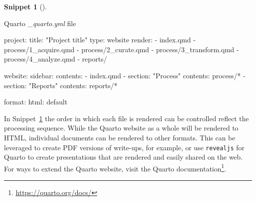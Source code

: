 \documentclass[
  letterpaper,
  krantz1]{latex/krantz-mod}
\newenvironment{Shaded}{\begin{snugshade}}{\end{snugshade}}
\newcommand{\AttributeTok}[1]{\textcolor[rgb]{0.00,0.00,0.00}{#1}}
\newcommand{\FunctionTok}[1]{\textcolor[rgb]{0.00,0.00,0.00}{#1}}
\newcommand{\KeywordTok}[1]{\textcolor[rgb]{0.00,0.00,0.00}{#1}}
\newcommand{\StringTok}[1]{\textcolor[rgb]{0.00,0.00,0.00}{#1}}
\theoremstyle{definition}
\theoremstyle{definition}
\newtheorem{definition}{Snippet}[chapter]
\theoremstyle{remark}
\DeclareRobustCommand{\href}[2]{#2\footnote{\url{#1}}}
\begin{document}
\begin{definition}[]\protect\hypertarget{def-quarto-yml}{}\label{def-quarto-yml}

Quarto \emph{\_quarto.yml} file

\begin{Shaded}
\begin{Highlighting}[]
\FunctionTok{project}\KeywordTok{:}
\AttributeTok{  }\FunctionTok{title}\KeywordTok{:}\AttributeTok{ }\StringTok{"Project title"}
\AttributeTok{  }\FunctionTok{type}\KeywordTok{:}\AttributeTok{ website}
\AttributeTok{  }\FunctionTok{render}\KeywordTok{:}
\AttributeTok{    }\KeywordTok{{-}}\AttributeTok{ index.qmd}
\AttributeTok{    }\KeywordTok{{-}}\AttributeTok{ process/1\_acquire.qmd}
\AttributeTok{    }\KeywordTok{{-}}\AttributeTok{ process/2\_curate.qmd}
\AttributeTok{    }\KeywordTok{{-}}\AttributeTok{ process/3\_transform.qmd}
\AttributeTok{    }\KeywordTok{{-}}\AttributeTok{ process/4\_analyze.qmd}
\AttributeTok{    }\KeywordTok{{-}}\AttributeTok{ reports/}

\FunctionTok{website}\KeywordTok{:}
\AttributeTok{  }\FunctionTok{sidebar}\KeywordTok{:}
\AttributeTok{    }\FunctionTok{contents}\KeywordTok{:}
\AttributeTok{      }\KeywordTok{{-}}\AttributeTok{ index.qmd}
\AttributeTok{      }\KeywordTok{{-}}\AttributeTok{ }\FunctionTok{section}\KeywordTok{:}\AttributeTok{ }\StringTok{"Process"}
\AttributeTok{        }\FunctionTok{contents}\KeywordTok{:}\AttributeTok{ process/*}
\AttributeTok{      }\KeywordTok{{-}}\AttributeTok{ }\FunctionTok{section}\KeywordTok{:}\AttributeTok{ }\StringTok{"Reports"}
\AttributeTok{        }\FunctionTok{contents}\KeywordTok{:}\AttributeTok{ reports/*}

\FunctionTok{format}\KeywordTok{:}
\AttributeTok{  }\FunctionTok{html}\KeywordTok{:}\AttributeTok{ default}
\end{Highlighting}
\end{Shaded}

\end{definition}

In Snippet~\ref{def-quarto-yml} the order in which each file is rendered
can be controlled reflect the processing sequence. While the Quarto
website as a whole will be rendered to HTML, individual documents can be
rendered to other formats. This can be leveraged to create PDF versions
of write-ups, for example, or use \texttt{revealjs} for Quarto to create
presentations that are rendered and easily shared on the web. For ways
to extend the Quarto website, visit the
\href{https://quarto.org/docs/}{Quarto documentation}.
\end{document}
